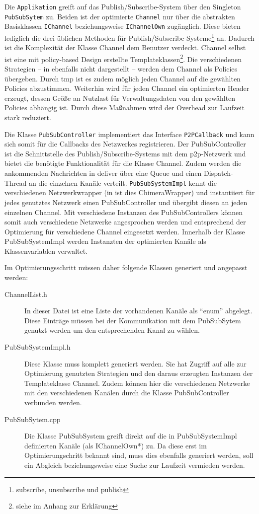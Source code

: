 Die \texttt{Applikation} greift auf das Publish/Subscribe-System über den Singleton \texttt{PubSubSytem} zu. Beiden ist der optimierte \texttt{Channel} nur über die abstrakten Basisklassen \texttt{IChannel} beziehungsweise \texttt{IChannelOwn} zugänglich. Diese bieten lediglich die drei üblichen Methoden für Publish/Subscribe-Systeme\footnote{subscribe, unsubscribe und publish} an. Dadurch ist die Komplexität der Klasse Channel dem Benutzer verdeckt. Channel selbst ist eine mit policy-based Design erstellte Templateklassen\footnote{siehe  im Anhang zur Erklärung}. Die verschiedenen Strategien -- in  ebenfalls nicht dargestellt -- werden dem Channel als Policies übergeben. Durch \ac{tmp} ist es zudem möglich jeden Channel auf die gewählten Policies abzustimmen. Weiterhin wird für jeden Channel ein optimierten Header erzeugt, dessen Größe an Nutzlast für Verwaltungsdaten von den gewählten Policies abhängig ist. Durch diese Maßnahmen wird der Overhead zur Laufzeit stark reduziert. 

Die Klasse \texttt{PubSubController} implementiert das Interface \texttt{P2PCallback} und kann sich somit für die Callbacks des Netzwerkes registrieren. Der PubSubController ist die Schnittstelle des Publish/Subscribe-Systems mit dem \ac{p2p}-Netzwerk und bietet die benötigte Funktionalität für die Klasse Channel. Zudem werden die ankommenden Nachrichten in deliver über eine Queue und einen Dispatch-Thread an die einzelnen Kanäle verteilt. \texttt{PubSubSystemImpl} kennt die verschiedenen Netzwerkwrapper (in  ist dies ChimeraWrapper) und instantiiert für jedes genutztes Netzwerk einen PubSubController und übergibt diesen an jeden einzelnen Channel. Mit verschiedene Instanzen des PubSubControllers können somit auch verschiedene Netzwerke angesprochen werden und entsprechend der Optimierung für verschiedene Channel eingesetzt werden. Innerhalb der Klasse PubSubSystemImpl werden Instanzten der optimierten Kanäle als Klassenvariablen verwaltet.

Im Optimierungsschritt müssen daher folgende Klassen generiert und angepasst werden:
\begin{description}
\item[ChannelList.h] In dieser Datei ist eine Liste der vorhandenen Kanäle als ``enum'' abgelegt. Diese Einträge müssen bei der Kommunikation mit dem PubSubSytem genutzt werden um den entsprechenden Kanal zu wählen.
\item[PubSubSystemImpl.h] Diese Klasse muss komplett generiert werden. Sie hat Zugriff auf alle zur Optimierung genutzten Strategien und den daraus erzeugten Instanzen der Templateklasse Channel. Zudem können hier die verschiedenen Netzwerke mit den verschiedenen Kanälen durch die Klasse PubSubController verbunden werden. 
\item[PubSubSytem.cpp] Die Klasse PubSubSystem greift direkt auf die in PubSubSystemImpl definierten Kanäle (als IChannelOwn*) zu. Da diese erst im Optimierungschritt bekannt sind, muss dies ebenfalls generiert werden, soll ein Abgleich beziehungsweise eine Suche zur Laufzeit vermieden werden.
\end{description}




